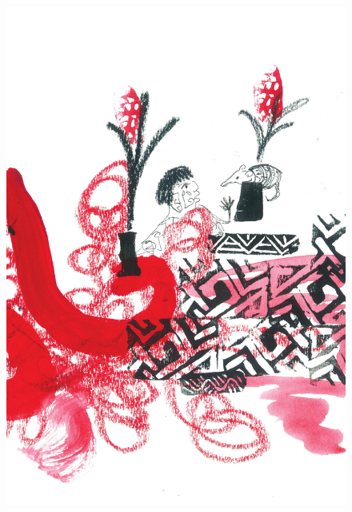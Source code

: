 \vspace*{\fill}

\pagebreak
\thispagestyle{empty}
\begin{figure}
\vspace*{-.5cm}
\hspace*{-2.2cm}\includegraphics[width=138mm]{./imgs/img11.pdf}
\end{figure}

\chapter*{}

\mbox{}\vspace*{\fill}



